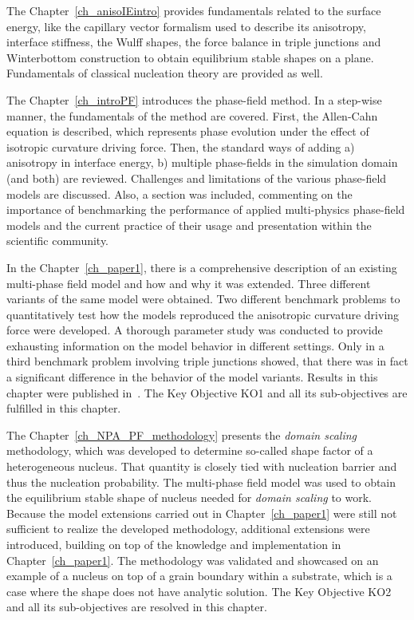 
The Chapter~\ref{ch_anisoIEintro} provides fundamentals related to the surface energy, like the capillary vector formalism used to describe its anisotropy, interface stiffness, the Wulff shapes, the force balance in triple junctions and Winterbottom construction to obtain equilibrium stable shapes on a plane. Fundamentals of classical nucleation theory are provided as well.

The Chapter~\ref{ch_introPF} introduces the phase-field method. In a step-wise manner, the fundamentals of the method are covered. First, the Allen-Cahn equation is described, which represents phase evolution under the effect of isotropic curvature driving force. Then, the standard ways of adding a) anisotropy in interface energy, b) multiple phase-fields in the simulation domain (and both) are reviewed. Challenges and limitations of the various phase-field models are discussed. Also, a section was included, commenting on the importance of benchmarking the performance of applied multi-physics phase-field models and the current practice of their usage and presentation within the scientific community.

In the Chapter~\ref{ch_paper1}, there is a comprehensive description of an existing multi-phase field model and how and why it was extended. Three different variants of the same model were obtained. Two different benchmark problems to quantitatively test how the models reproduced the anisotropic curvature driving force were developed. A thorough parameter study was conducted to provide exhausting information on the model behavior in different settings. Only in a third benchmark problem involving triple junctions showed, that there was in fact a significant difference in the behavior of the model variants. Results in this chapter were published in~\cite{Minar2022}. The Key Objective KO1 and all its sub-objectives are fulfilled in this chapter.

The Chapter~\ref{ch_NPA_PF_methodology} presents the \textit{domain scaling} methodology, which was developed to determine so-called shape factor of a heterogeneous nucleus. That quantity is closely tied with nucleation barrier and thus the nucleation probability. The multi-phase field model was used to obtain the equilibrium stable shape of nucleus needed for \textit{domain scaling} to work. Because the model extensions carried out in Chapter~\ref{ch_paper1} were still not sufficient to realize the developed methodology, additional extensions were introduced, building on top of the knowledge and implementation in Chapter~\ref{ch_paper1}. The methodology was validated and showcased on an example of a nucleus on top of a grain boundary within a substrate, which is a case where the shape does not have analytic solution. The Key Objective KO2 and all its sub-objectives are resolved in this chapter.


